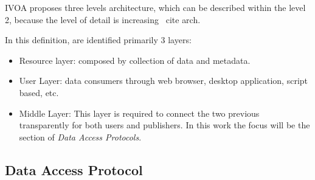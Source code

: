 
IVOA proposes three levels architecture, which can be described within the
level 2, because the level of detail is increasing \ cite {arch}.

In this definition, are identified primarily 3 layers:
\begin{itemize}
	\item Resource layer: composed by collection of data and metadata.
	\item User Layer: data consumers through web browser, desktop application, script based, etc.
	\item Middle Layer: This layer is required to connect the two previous
transparently for both users and publishers. In this work the focus will be the
section of \emph{Data Access Protocols}.
\end{itemize}

\subsection{Data Access Protocol}

